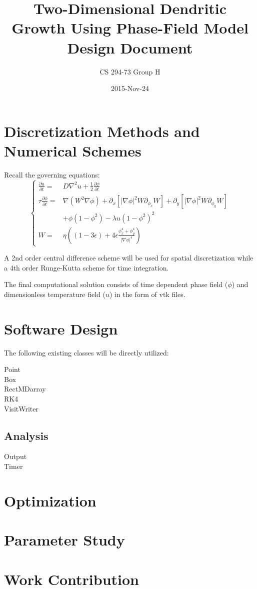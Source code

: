 \documentclass{article}
\title{Two-Dimensional Dendritic Growth Using Phase-Field Model \\ Design Document}
\date{2015-Nov-24}
\author{CS 294-73 Group H}
\begin{document}
\maketitle
    
\section{Discretization Methods and Numerical Schemes}
Recall the governing equations:
\begin{equation}
\begin{cases}
\frac{\partial u}{\partial t} =&D\nabla^2u+\frac{1}{2}\frac{\partial\phi}{\partial t} \\
\tau\frac{\partial \phi}{\partial t} =&\nabla(W^2\nabla\phi)+\partial_x[|\nabla\phi|^2W\partial_{\phi_x}W]+\partial_y[|\nabla\phi|^2W\partial_{\phi_y}W] \\
&+\phi(1-\phi^2)-\lambda u(1-\phi^2)^2 \\
W=&\eta((1-3\epsilon)+4\epsilon\frac{\phi_x^4+\phi_y^4}{|\nabla\phi|^4})
\end{cases}
\end{equation}

A 2nd order central difference scheme will be used for spatial discretization while a 4th order Runge-Kutta scheme for time integration. 

The final computational solution consists of time dependent phase field ($\phi$) and dimensionless temperature field ($u$) in the form of vtk files.

\section{Software Design}
The following existing classes will be directly utilized:
\begin{description}
\item[Point]
\item[Box]
\item[RectMDarray]
\item[RK4]
\item[VisitWriter]
\item[]
\end{description}

\subsection{Analysis}
\begin{description}
\item[Output]
\item[Timer]
\end{description} 
	
\section{Optimization}
\section{Parameter Study} 
\section{Work Contribution} 
\end{document}
